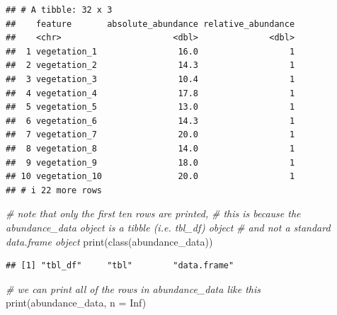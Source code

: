 \documentclass[
  12pt,
]{book}
\newenvironment{Shaded}{\begin{snugshade}}{\end{snugshade}}
\newcommand{\AttributeTok}[1]{\textcolor[rgb]{0.77,0.63,0.00}{#1}}
\newcommand{\CommentTok}[1]{\textcolor[rgb]{0.56,0.35,0.01}{\textit{#1}}}
\newcommand{\ConstantTok}[1]{\textcolor[rgb]{0.00,0.00,0.00}{#1}}
\newcommand{\FunctionTok}[1]{\textcolor[rgb]{0.00,0.00,0.00}{#1}}
\newcommand{\NormalTok}[1]{#1}
\begin{document}
\begin{verbatim}
## # A tibble: 32 x 3
##    feature       absolute_abundance relative_abundance
##    <chr>                      <dbl>              <dbl>
##  1 vegetation_1                16.0                  1
##  2 vegetation_2                14.3                  1
##  3 vegetation_3                10.4                  1
##  4 vegetation_4                17.8                  1
##  5 vegetation_5                13.0                  1
##  6 vegetation_6                14.3                  1
##  7 vegetation_7                20.0                  1
##  8 vegetation_8                14.0                  1
##  9 vegetation_9                18.0                  1
## 10 vegetation_10               20.0                  1
## # i 22 more rows
\end{verbatim}

\clearpage

\begin{Shaded}
\begin{Highlighting}[]
\CommentTok{\# note that only the first ten rows are printed,}
\CommentTok{\# this is because the abundance\_data object is a tibble (i.e. tbl\_df) object}
\CommentTok{\# and not a standard data.frame object}
\FunctionTok{print}\NormalTok{(}\FunctionTok{class}\NormalTok{(abundance\_data))}
\end{Highlighting}
\end{Shaded}

\begin{verbatim}
## [1] "tbl_df"     "tbl"        "data.frame"
\end{verbatim}

\begin{Shaded}
\begin{Highlighting}[]
\CommentTok{\# we can print all of the rows in abundance\_data like this}
\FunctionTok{print}\NormalTok{(abundance\_data, }\AttributeTok{n =} \ConstantTok{Inf}\NormalTok{)}
\end{Highlighting}
\end{Shaded}
\end{document}
